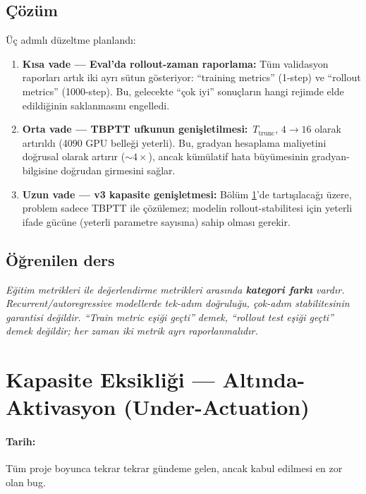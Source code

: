 \subsection*{Çözüm}

Üç adımlı düzeltme planlandı:
\begin{enumerate}
    \item \textbf{Kısa vade --- Eval'da rollout-zaman raporlama:} Tüm validasyon raporları artık iki ayrı sütun gösteriyor: ``training metrics'' (1-step) ve ``rollout metrics'' (1000-step). Bu, gelecekte ``çok iyi'' sonuçların hangi rejimde elde edildiğinin saklanmasını engelledi.
    \item \textbf{Orta vade --- TBPTT ufkunun genişletilmesi:} \,$T_{\text{trunc}}$, $4 \to 16$ olarak artırıldı (4090 GPU belleği yeterli). Bu, gradyan hesaplama maliyetini doğrusal olarak artırır ($\sim 4\times$), ancak kümülatif hata büyümesinin gradyan-bilgisine doğrudan girmesini sağlar.
    \item \textbf{Uzun vade --- v3 kapasite genişletmesi:} Bölüm \ref{sec:bug_undercapacity}'de tartışılacağı üzere, problem sadece TBPTT ile çözülemez; modelin rollout-stabilitesi için yeterli ifade gücüne (yeterli parametre sayısına) sahip olması gerekir.
\end{enumerate}

\subsection*{Öğrenilen ders}

\begin{remark}
\textit{Eğitim metrikleri ile değerlendirme metrikleri arasında \textbf{kategori farkı} vardır. Recurrent/autoregressive modellerde tek-adım doğruluğu, çok-adım stabilitesinin garantisi değildir. ``Train metric eşiği geçti'' demek, ``rollout test eşiği geçti'' demek değildir; her zaman iki metrik ayrı raporlanmalıdır.}
\end{remark}


\section{Kapasite Eksikliği --- Altında-Aktivasyon (Under-Actuation)}
\label{sec:bug_undercapacity}

\paragraph{Tarih:} Tüm proje boyunca tekrar tekrar gündeme gelen, ancak kabul edilmesi en zor olan bug.


